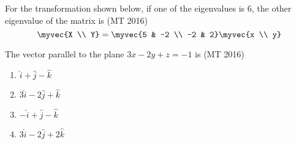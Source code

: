 \item For the transformation shown below, if one of the eigenvalues is 6, the other eigenvalue of the matrix is
\hfill(MT 2016)
$$\myvec{X \\ Y} =
\myvec {5 & -2 \\ -2 & 2}
\myvec{x \\ y}$$
\item The vector parallel to the plane $3x - 2y + z = -1$ is
\hfill(MT 2016)
\begin{multicols}{4}
\begin{enumerate}
\item $\hat{i} + \hat{j} - \hat{k}$
\item $3\hat{i} - 2\hat{j} + \hat{k}$
\item $-\hat{i} + \hat{j} - \hat{k}$
\item $3\hat{i} - 2\hat{j} + 2\hat{k}$
\end{enumerate}
\end{multicols}

